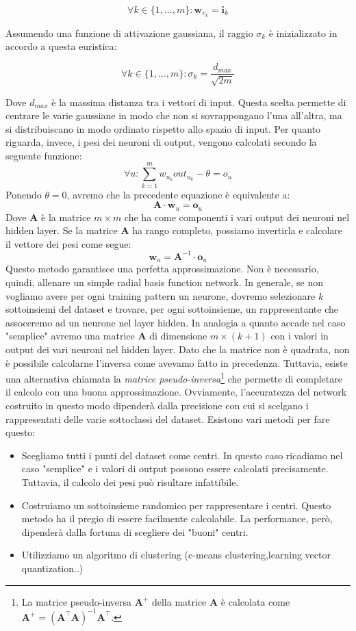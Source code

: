 \documentclass[10pt,a4paper]{article}
\newcommand{\ww}{\mathbf{w}}
\newcommand{\ii}{\mathbf{i}}
\newcommand{\oo}{\mathbf{o}}
\begin{document}
$$
\forall k \in \{1,\dots,m\}: \ww_{v_k} = \ii_k
$$

Assumendo una funzione di attivazione gaussiana, il raggio $\sigma_k$ è inizializzato in accordo a questa euristica:

$$
\forall k \in \{1,\dots,m\}: \sigma_k = \frac{d_{max}}{\sqrt{2m}}
$$

Dove $d_{max}$ è la massima distanza tra i vettori di input. Questa scelta permette di centrare le varie gaussiane in modo che non si sovrappongano l'una all'altra, ma si distribuiscano in modo ordinato rispetto allo spazio di input. Per quanto riguarda, invece, i pesi dei neuroni di output, vengono calcolati secondo la seguente funzione:
$$
\forall u: \sum_{k=1}^m w_{u_k} out_{u_k} - \theta  = o_u
$$
Ponendo $\theta = 0$, avremo che la precedente equazione è equivalente a:
$$ 
\mathbf{A}\cdot \ww_u = \oo_u
$$
Dove $\mathbf{A}$ è la matrice $m \times m$ che ha come componenti i vari output dei neuroni nel hidden layer. Se la matrice $\mathbf{A}$ ha rango completo, possiamo invertirla e calcolare il vettore dei pesi come segue:
$$
\ww_u = \mathbf{A}^{-1}\cdot \oo_u
$$
Questo metodo garantisce una perfetta approssimazione. Non è necessario, quindi, allenare un simple radial basis function network. In generale, se non vogliamo avere per ogni training pattern un neurone, dovremo selezionare $k$ sottoinsiemi del dataset e trovare, per ogni sottoinsieme, un rappresentante che  assoceremo ad un neurone nel layer hidden. In analogia a quanto accade nel caso "semplice" avremo una matrice $\mathbf{A}$ di dimensione $m\times (k+1)$ con i valori in output dei vari neuroni nel hidden layer. Dato che la matrice non è quadrata, non è possibile calcolarne l'inversa come avevamo fatto in precedenza. Tuttavia, esiste una alternativa chiamata la \emph{matrice pseudo-inversa}\footnote{La matrice pseudo-inversa $\mathbf{A}^+$ della matrice $\mathbf{A}$ è calcolata come $\mathbf{A}^+ = (\mathbf{A}^{\top}\mathbf{A})^{-1}\mathbf{A}^{\top}$.} che permette di completare il calcolo con una buona approssimazione. Ovviamente, l'accuratezza del network costruito in questo modo dipenderà dalla precisione con cui si scelgano i rappresentati delle varie sottoclassi del dataset. Esistono vari metodi per fare questo:
\begin{itemize}
\item{Scegliamo tutti i punti del dataset come centri. In questo caso ricadiamo nel caso "semplice" e i valori di output possono essere calcolati precisamente. Tuttavia, il calcolo dei pesi può risultare infattibile.}
\item{Costruiamo un sottoinsieme randomico per rappresentare i centri. Questo metodo ha il pregio di essere facilmente calcolabile. La performance, però, dipenderà dalla fortuna di scegliere dei "buoni" centri.}
\item{Utilizziamo un algoritmo di clustering (c-means clustering,learning vector quantization..)}
\end{itemize}
\end{document}
